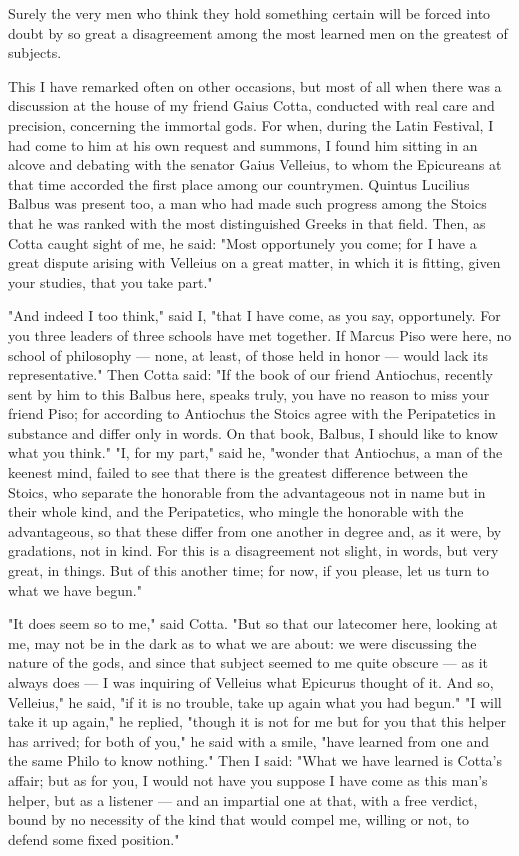  Surely the very men who think they hold something certain will be forced into doubt by so great a disagreement among the most learned men on the greatest of subjects.

 This I have remarked often on other occasions, but most of all when there was a discussion at the house of my friend Gaius Cotta, conducted with real care and precision, concerning the immortal gods. For when, during the Latin Festival, I had come to him at his own request and summons, I found him sitting in an alcove and debating with the senator Gaius Velleius, to whom the Epicureans at that time accorded the first place among our countrymen. Quintus Lucilius Balbus was present too, a man who had made such progress among the Stoics that he was ranked with the most distinguished Greeks in that field. Then, as Cotta caught sight of me, he said: "Most opportunely you come; for I have a great dispute arising with Velleius on a great matter, in which it is fitting, given your studies, that you take part."

 "And indeed I too think," said I, "that I have come, as you say, opportunely. For you three leaders of three schools have met together. If Marcus Piso were here, no school of philosophy — none, at least, of those held in honor — would lack its representative." Then Cotta said: "If the book of our friend Antiochus, recently sent by him to this Balbus here, speaks truly, you have no reason to miss your friend Piso; for according to Antiochus the Stoics agree with the Peripatetics in substance and differ only in words. On that book, Balbus, I should like to know what you think." "I, for my part," said he, "wonder that Antiochus, a man of the keenest mind, failed to see that there is the greatest difference between the Stoics, who separate the honorable from the advantageous not in name but in their whole kind, and the Peripatetics, who mingle the honorable with the advantageous, so that these differ from one another in degree and, as it were, by gradations, not in kind. For this is a disagreement not slight, in words, but very great, in things. But of this another time; for now, if you please, let us turn to what we have begun."

 "It does seem so to me," said Cotta. "But so that our latecomer here, looking at me, may not be in the dark as to what we are about: we were discussing the nature of the gods, and since that subject seemed to me quite obscure — as it always does — I was inquiring of Velleius what Epicurus thought of it. And so, Velleius," he said, "if it is no trouble, take up again what you had begun." "I will take it up again," he replied, "though it is not for me but for you that this helper has arrived; for both of you," he said with a smile, "have learned from one and the same Philo to know nothing." Then I said: "What we have learned is Cotta's affair; but as for you, I would not have you suppose I have come as this man's helper, but as a listener — and an impartial one at that, with a free verdict, bound by no necessity of the kind that would compel me, willing or not, to defend some fixed position."


